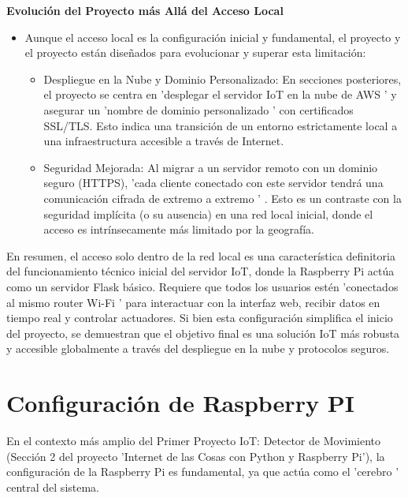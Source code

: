 \documentclass{report}
\begin{document}
\textbf{Evolución del Proyecto más Allá del Acceso Local}
\begin{itemize}
\item Aunque el acceso local es la configuración inicial y fundamental, el proyecto y el proyecto están diseñados para evolucionar y superar esta limitación:
    \begin{itemize}
        \item Despliegue en la Nube y Dominio Personalizado:  En secciones posteriores, el proyecto se centra en   'desplegar el servidor IoT en la nube 
        de AWS '  y asegurar un   'nombre de dominio personalizado '  con certificados SSL/TLS. Esto indica una transición de un entorno estrictamente 
        local a una infraestructura accesible a través de Internet.
        \item Seguridad Mejorada:  Al migrar a un servidor remoto con un dominio seguro (HTTPS),   'cada cliente conectado con este servidor tendrá una 
        comunicación cifrada de extremo a extremo ' . Esto es un contraste con la seguridad implícita (o su ausencia) en una red local inicial, 
        donde el acceso es intrínsecamente más limitado por la geografía.
    \end{itemize}
\end{itemize}
En resumen, el  acceso solo dentro de la red local  es una característica definitoria del  funcionamiento técnico inicial  del servidor IoT, donde 
la Raspberry Pi actúa como un servidor Flask básico. Requiere que todos los usuarios estén   'conectados al mismo router Wi-Fi '  para interactuar 
con la interfaz web, recibir datos en tiempo real y controlar actuadores. Si bien esta configuración simplifica el inicio del proyecto, se  
demuestran que el objetivo final es una solución IoT más robusta y accesible globalmente a través del despliegue en la nube y protocolos seguros.

\section{Configuración de Raspberry PI}
En el contexto más amplio del  Primer Proyecto IoT: Detector de Movimiento  (Sección 2 del proyecto  'Internet de las Cosas con Python y Raspberry Pi'), 
la configuración de la Raspberry Pi es fundamental, ya que actúa como el  'cerebro ' central del sistema.
\end{document}
